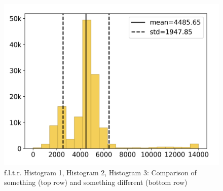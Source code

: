 \begin{figure}[H]
\begin{minipage}{.325\textwidth}
		\includegraphics[width=\textwidth, trim=.25cm 0.25cm .25cm 0.25cm]{Resources/Images/Images/Histogram/hist_3_b.png}
	\end{minipage}
	\caption{f.l.t.r. Histogram 1, Histogram 2, Histogram 3: Comparison of something (top row) and something different (bottom row)}
	\label{fig:images:histograms}
\end{figure}
